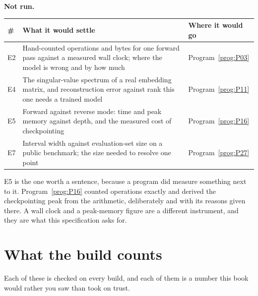 \medskip
\textbf{Not run.}

\begin{center}
\begin{tabularx}{\linewidth}{@{}lXl@{}}
\toprule
\textbf{\#} & \textbf{What it would settle} & \textbf{Where it would go} \\
\midrule
E2 & Hand-counted operations and bytes for one forward pass against a
  measured wall clock; where the model is wrong and by how much &
  Program~\ref{prog:P03} \\
E4 & The singular-value spectrum of a real embedding matrix, and
  reconstruction error against rank \dash{} this one needs a trained model &
  Program~\ref{prog:P11} \\
E5 & Forward against reverse mode: time and peak memory against depth, and
  the measured cost of checkpointing & Program~\ref{prog:P16} \\
E7 & Interval width against evaluation-set size on a public benchmark; the
  size needed to resolve one point & Program~\ref{prog:P27} \\
\bottomrule
\end{tabularx}
\end{center}

E5 is the one worth a sentence, because a program did measure something
next to it. Program~\ref{prog:P16} counted operations exactly and derived
the checkpointing peak from the arithmetic, deliberately and with its
reasons given there. A wall clock and a peak-memory figure are a different
instrument, and they are what this specification asks for.

\section{What the build counts}
\label{sec:F-ledgers}

Each of these is checked on every build, and each of them is a number this
book would rather you saw than took on trust.

